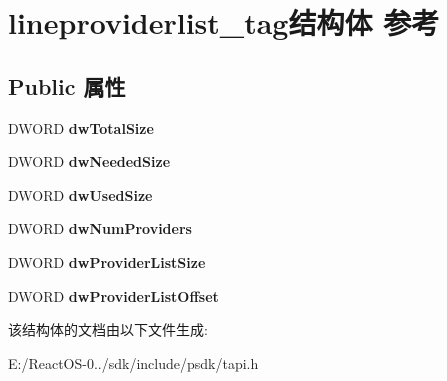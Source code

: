 \hypertarget{structlineproviderlist__tag}{}\section{lineproviderlist\+\_\+tag结构体 参考}
\label{structlineproviderlist__tag}
\subsection*{Public 属性}
\begin{DoxyCompactItemize}
\item 
\mbox{\label{structlineproviderlist__tag_aaa6989342b545b080ea234f8a618785c}} 
D\+W\+O\+RD {\bfseries dw\+Total\+Size}
\item 
\mbox{\label{structlineproviderlist__tag_aaf97d06737ff332078228cd9639bce06}} 
D\+W\+O\+RD {\bfseries dw\+Needed\+Size}
\item 
\mbox{\label{structlineproviderlist__tag_a66eaa0fe2fc3ae44aa1d1a055f93c154}} 
D\+W\+O\+RD {\bfseries dw\+Used\+Size}
\item 
\mbox{\label{structlineproviderlist__tag_a8719dfffe3234a6b38339b07a55f5179}} 
D\+W\+O\+RD {\bfseries dw\+Num\+Providers}
\item 
\mbox{\label{structlineproviderlist__tag_a8bf2bb3918f6cd4b3599695a4f60a19c}} 
D\+W\+O\+RD {\bfseries dw\+Provider\+List\+Size}
\item 
\mbox{\label{structlineproviderlist__tag_a3b8100b4b17fdba74d0f68a16065ca5c}} 
D\+W\+O\+RD {\bfseries dw\+Provider\+List\+Offset}
\end{DoxyCompactItemize}


该结构体的文档由以下文件生成\+:\begin{DoxyCompactItemize}
\item 
E\+:/\+React\+O\+S-\/0../sdk/include/psdk/tapi.\+h\end{DoxyCompactItemize}
